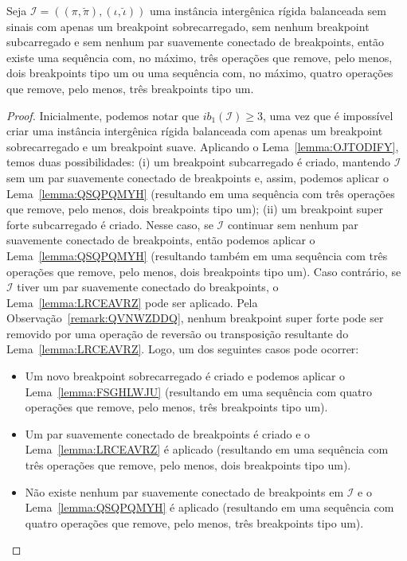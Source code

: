 \begin{lemma}\label{lemma:WGHTDURW}
Seja $\mathcal{I} = ((\pi,\breve\pi),(\iota,\breve\iota))$ uma instância intergênica rígida balanceada sem sinais com apenas um breakpoint sobrecarregado, sem nenhum breakpoint subcarregado e sem nenhum par suavemente conectado de breakpoints, então existe uma sequência com, no máximo, três operações que remove, pelo menos, dois breakpoints tipo um ou uma sequência com, no máximo, quatro operações que remove, pelo menos, três breakpoints tipo um.
\end{lemma}
\begin{proof}
Inicialmente, podemos notar que $ib_1(\mathcal{I}) \ge 3$, uma vez que é impossível criar uma instância intergênica rígida balanceada com apenas um breakpoint sobrecarregado e um breakpoint suave. Aplicando o Lema~\ref{lemma:OJTODIFY}, temos duas possibilidades: (i) um breakpoint subcarregado é criado, mantendo $\mathcal{I}$ sem um par suavemente conectado de breakpoints e, assim, podemos aplicar o Lema~\ref{lemma:QSQPQMYH} (resultando em uma sequência com três operações que remove, pelo menos, dois breakpoints tipo um); (ii) um breakpoint super forte subcarregado é criado. Nesse caso, se $\mathcal{I}$ continuar sem nenhum par suavemente conectado de breakpoints, então podemos aplicar o Lema~\ref{lemma:QSQPQMYH} (resultando também em uma sequência com três operações que remove, pelo menos, dois breakpoints tipo um). Caso contrário, se $\mathcal{I}$ tiver um par suavemente conectado do breakpoints, o Lema~\ref{lemma:LRCEAVRZ} pode ser aplicado. Pela Observação~\ref{remark:QVNWZDDQ}, nenhum breakpoint super forte pode ser removido por uma operação de reversão ou transposição resultante do Lema~\ref{lemma:LRCEAVRZ}. Logo, um dos seguintes casos pode ocorrer:
\begin{itemize}
  \item Um novo breakpoint sobrecarregado é criado e podemos aplicar o Lema~\ref{lemma:FSGHLWJU} (resultando em uma sequência com quatro operações que remove, pelo menos, três breakpoints tipo um).
  \item Um par suavemente conectado de breakpoints é criado e o Lema~\ref{lemma:LRCEAVRZ} é aplicado (resultando em uma sequência com três operações que remove, pelo menos, dois breakpoints tipo um).
  \item Não existe nenhum par suavemente conectado de breakpoints em $\mathcal{I}$ e o Lema~\ref{lemma:QSQPQMYH} é aplicado (resultando em uma sequência com quatro operações que remove, pelo menos, três breakpoints tipo um).
\end{itemize}
\end{proof}

